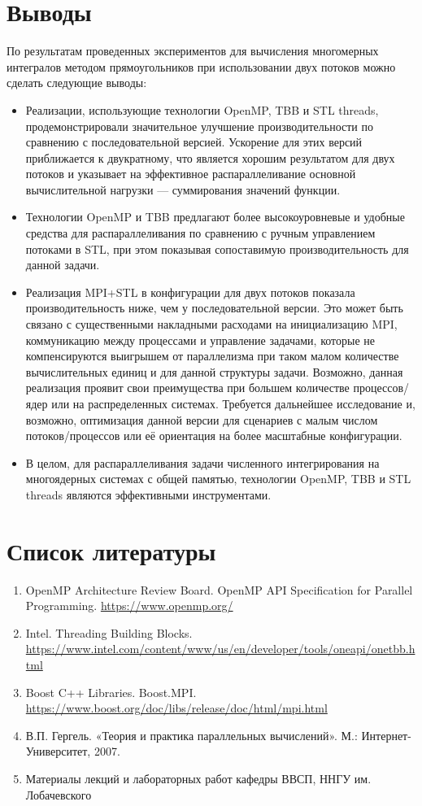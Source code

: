 \documentclass[12pt]{article}
\begin{document}
\section{Выводы}
По результатам проведенных экспериментов для вычисления многомерных интегралов методом прямоугольников при использовании двух потоков можно сделать следующие выводы:
\begin{itemize}
  \item Реализации, использующие технологии OpenMP, TBB и STL threads, продемонстрировали значительное улучшение производительности по сравнению с последовательной версией. Ускорение для этих версий приближается к двукратному, что является хорошим результатом для двух потоков и указывает на эффективное распараллеливание основной вычислительной нагрузки — суммирования значений функции.
  \item Технологии OpenMP и TBB предлагают более высокоуровневые и удобные средства для распараллеливания по сравнению с ручным управлением потоками в STL, при этом показывая сопоставимую производительность для данной задачи.
  \item Реализация MPI+STL в конфигурации для двух потоков показала производительность ниже, чем у последовательной версии. Это может быть связано с существенными накладными расходами на инициализацию MPI, коммуникацию между процессами и управление задачами, которые не компенсируются выигрышем от параллелизма при таком малом количестве вычислительных единиц и для данной структуры задачи. Возможно, данная реализация проявит свои преимущества при большем количестве процессов/ядер или на распределенных системах. Требуется дальнейшее исследование и, возможно, оптимизация данной версии для сценариев с малым числом потоков/процессов или её ориентация на более масштабные конфигурации.
  \item В целом, для распараллеливания задачи численного интегрирования на многоядерных системах с общей памятью, технологии OpenMP, TBB и STL threads являются эффективными инструментами.
\end{itemize}

\section*{Список литературы}
\begin{enumerate}
  \item OpenMP Architecture Review Board. OpenMP API Specification for Parallel Programming. \url{https://www.openmp.org/}
  \item Intel. Threading Building Blocks. \url{https://www.intel.com/content/www/us/en/developer/tools/oneapi/onetbb.html}
  \item Boost C++ Libraries. Boost.MPI. \url{https://www.boost.org/doc/libs/release/doc/html/mpi.html}
  \item В.П. Гергель. «Теория и практика параллельных вычислений». М.: Интернет-Университет, 2007.
  \item Материалы лекций и лабораторных работ кафедры ВВСП, ННГУ им. Лобачевского
\end{enumerate}
\end{document}
